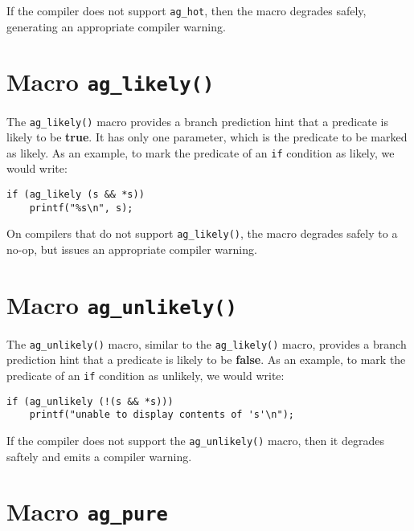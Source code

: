 If the compiler does not support \texttt{ag\_hot}, then the macro degrades
safely, generating an appropriate compiler warning.

\section{Macro \texttt{ag\_likely()}}
The \verb|ag_likely()| macro provides a branch prediction hint that a predicate
is likely to be \textbf{true}. It has only one parameter, which is the predicate 
to be marked as likely. As an example, to mark the predicate of an \verb|if| 
condition as likely, we would write:
\begin{lstlisting}[linewidth=1.0\linewidth]
if (ag_likely (s && *s)) 
    printf("%s\n", s);
\end{lstlisting}

On compilers that do not support \verb|ag_likely()|, the macro degrades safely
to a no-op, but issues an appropriate compiler warning.

\section{Macro \texttt{ag\_unlikely()}}
The \verb|ag_unlikely()| macro, similar to the \verb|ag_likely()| macro,
provides a branch prediction hint that a predicate is likely to be 
\textbf{false}. As an example, to mark the predicate of an \verb|if| condition 
as unlikely, we would write:
\begin{lstlisting}[linewidth=1.0\linewidth]
if (ag_unlikely (!(s && *s))) 
    printf("unable to display contents of 's'\n");
\end{lstlisting}

If the compiler does not support the \verb|ag_unlikely()| macro, then it
degrades saftely and emits a compiler warning.

\section{Macro \texttt{ag\_pure}}

